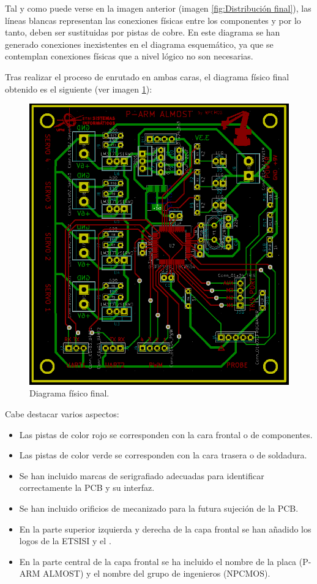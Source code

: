 Tal y como puede verse en la imagen anterior (imagen \ref{fig:Distribución final}), las líneas blancas representan las conexiones físicas entre los componentes y por lo tanto, deben ser sustituidas por pistas de cobre. En este diagrama se han generado conexiones inexistentes en el diagrama esquemático, ya que se contemplan conexiones físicas que a nivel lógico no son necesarias.

Tras realizar el proceso de enrutado en ambas caras, el diagrama físico final obtenido es el siguiente (ver imagen \ref{fig:Fisico_Final}):

\begin{figure}[H]
\centering
\includegraphics[width=0.9\linewidth]{pictures/PCB_FINAL_FIXED.PNG}
\caption{Diagrama físico final.}
\label{fig:Fisico_Final}
\end{figure}

Cabe destacar varios aspectos:
\begin{itemize}
    \item Las pistas de color rojo se corresponden con la cara frontal o de componentes.
    \item Las pistas de color verde se corresponden con la cara trasera o de soldadura.
    \item Se han incluido marcas de serigrafiado adecuadas para identificar correctamente la \ac{PCB} y su interfaz.
    \item Se han incluido orificios de mecanizado para la futura sujeción de la \ac{PCB}.
    \item En la parte superior izquierda y derecha de la capa frontal se han añadido los logos de la ETSISI y el \pArm{}.
    \item En la parte central de la capa frontal se ha incluido el nombre de la placa (P-ARM ALMOST) y el nombre del grupo de ingenieros (NPCMOS).
\end{itemize}

